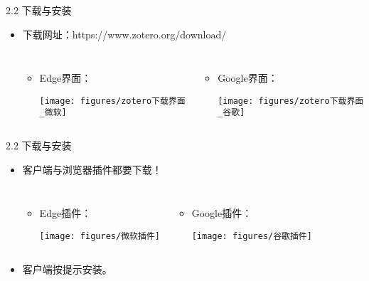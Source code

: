 \documentclass{beamer}%
\begin{document}
\begin{frame}[t]{2.2 下载与安装}
\begin{itemize}
  \item 下载网址：https://www.zotero.org/download/

\begin{columns}[onlytextwidth]
\begin{itemize}
  \item Edge界面：
\begin{center}
		\texttt{[image: figures/zotero下载界面\_微软]}
\end{center}


\end{itemize}
\begin{itemize}
  \item Google界面：
\begin{center}
		\texttt{[image: figures/zotero下载界面\_谷歌]}
\end{center}

\end{itemize}
\end{columns}
\end{itemize}
\end{frame}


\begin{frame}[t]{2.2 下载与安装}
\begin{itemize}
\item 客户端与浏览器插件都要下载！
\begin{columns}[onlytextwidth]
\begin{itemize}
\item Edge插件：
\begin{center}
		\texttt{[image: figures/微软插件]}
\end{center}
\end{itemize}
\begin{itemize}
\item Google插件：
\begin{center}
		\texttt{[image: figures/谷歌插件]}
\end{center}
\end{itemize}
\end{columns}
\item 客户端按提示安装。
\end{itemize}
\end{frame}
\end{document}
